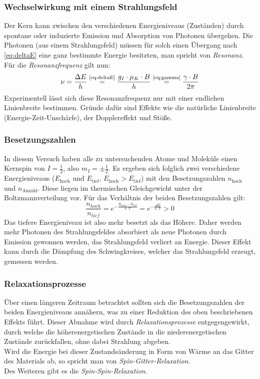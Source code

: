 \subsubsection{Wechselwirkung mit einem Strahlungsfeld}
Der Kern kann zwischen den verschiedenen Energieniveaus (Zuständen) durch spontane oder induzierte Emission und Absorption von Photonen übergehen. 
Die Photonen (aus einem Strahlungsfeld) müssen für solch einen Übergang nach \autoref{eq:deltaE} eine ganz bestimmte Energie besitzten, man spricht 
von \emph{Resonanz}. Für die \emph{Resonanzfrequenz} gilt nun:
\begin{equation}
  \label{eq:nu}
  \nu = \frac{\Delta E}{h} \refeq{eq:deltaE} \frac{g_I \cdot \mu_K \cdot B}{h} \refeq{eq:gamma} \frac{\gamma \cdot B}{2 \pi}
\end{equation}
Experimentell lässt sich diese Resonanzfrequenz nur mit einer endlichen Linienbreite bestimmen. Gründe dafür sind Effekte wie die natürliche 
Linienbreite (Energie-Zeit-Unschärfe), der Dopplereffekt und Stöße.

\subsubsection{Besetzungszahlen}
In diesem Versuch haben alle zu untersuchenden Atome und Moleküle einen Kernspin von $I=\frac{1}{2}$, also $m_I = \pm \frac{1}{2}$. Es ergeben sich 
folglich zwei verschiedene Energieniveaus ($E_{\text{hoch}}$ und $E_{\text{tief}}$, $E_{\text{hoch}} > E_{\text{tief}}$) mit den 
Besetzungszahlen $n_{\text{hoch}}$ und $n_{\text{Anzahl}}$. 
Diese liegen im thermischen Gleichgewicht unter der Boltzmannverteilung vor. Für das Verhältnis der beiden Besetzungszahlen gilt:
\begin{equation}
  \frac{n_{hoch}}{n_{tief}} = e^{-\frac{E_\text{hoch} - E_\text{tief}}{k \cdot T}} = e^{- \frac{\Delta E}{k \cdot T}} > 0
\end{equation}
Das tiefere Energieniveau ist also mehr besetzt als das Höhere. Daher werden mehr Photonen des Strahlungsfeldes absorbiert als neue Photonen durch 
Emission gewonnen werden, das Strahlungsfeld verliert an Energie. Dieser Effekt kann durch die Dämpfung des Schwingkreises, welcher das 
Strahlungsfeld erzeugt, gemessen werden.

\subsubsection{Relaxationsprozesse}
Über einen längeren Zeitraum betrachtet sollten sich die Besetzungszahlen der beiden Energieniveaus annähern, was zu einer Reduktion des oben 
beschriebenen Effekts führt. Dieser Abnahme wird durch \emph{Relaxationsprozesse} entgegengewirkt, durch welche die höherenergetischen Zustände 
in die niederenergetischen Zustände zurückfallen, ohne dabei Strahlung abgeben. \\
Wird die Energie bei dieser Zustandsänderung in Form von Wärme an das Gitter des Materials ab, so spricht man von \emph{Spin-Gitter-Relaxation}. \\
Des Weiteren gibt es die \emph{Spin-Spin-Relaxation}. %

